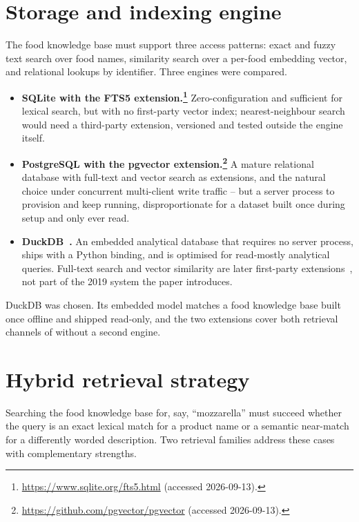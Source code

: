 \section{Storage and indexing engine}
\label{sec:tools-storage}

The food knowledge base must support three access patterns: exact and fuzzy text search over food names, similarity search over a per-food embedding vector, and relational lookups by identifier. Three engines were compared.

\begin{itemize}
    \item \textbf{SQLite with the FTS5 extension.\footnote{\url{https://www.sqlite.org/fts5.html} (accessed 2026-09-13).}} Zero-configuration and sufficient for lexical search, but with no first-party vector index; nearest-neighbour search would need a third-party extension, versioned and tested outside the engine itself.
    \item \textbf{PostgreSQL with the pgvector extension.\footnote{\url{https://github.com/pgvector/pgvector} (accessed 2026-09-13).}} A mature relational database with full-text and vector search as extensions, and the natural choice under concurrent multi-client write traffic -- but a server process to provision and keep running, disproportionate for a dataset built once during setup and only ever read.
    \item \textbf{DuckDB~\cite{raasveldt2019duckdb}.} An embedded analytical database that requires no server process, ships with a Python binding, and is optimised for read-mostly analytical queries. Full-text search and vector similarity are later first-party extensions~\cite{duckdb2026fts,duckdb2026vss}, not part of the 2019 system the paper introduces.
\end{itemize}

DuckDB was chosen. Its embedded model matches a food knowledge base built once offline and shipped read-only, and the two extensions cover both retrieval channels of  without a second engine.

\section{Hybrid retrieval strategy}
\label{sec:tools-retrieval}

Searching the food knowledge base for, say, \enquote{mozzarella} must succeed whether the query is an exact lexical match for a product name or a semantic near-match for a differently worded description. Two retrieval families address these cases with complementary strengths.

